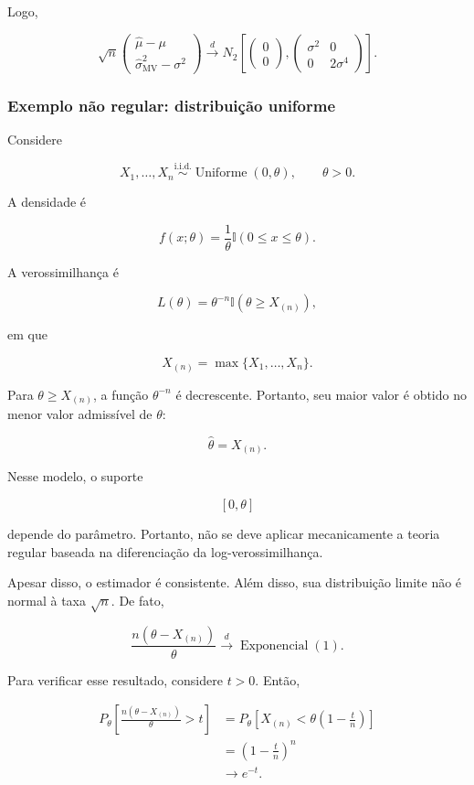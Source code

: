 \documentclass[
  letterpaper,
  DIV=11,
  numbers=noendperiod]{scrreprt}
\begin{document}
Logo,

\[\sqrt n
\begin{pmatrix}
\widehat\mu-\mu\\
\widehat{\sigma}^2_{\mathrm{MV}}-\sigma^2
\end{pmatrix}
\xrightarrow{d}
N_2
\left[
\begin{pmatrix}
0\\
0
\end{pmatrix},
\begin{pmatrix}
\sigma^2 & 0\\
0 & 2\sigma^4
\end{pmatrix}
\right].\]

\subsubsection{Exemplo não regular: distribuição
uniforme}\label{exemplo-nuxe3o-regular-distribuiuxe7uxe3o-uniforme}

Considere

\[X_1,\ldots,X_n
\overset{\mathrm{i.i.d.}}{\sim}
\operatorname{Uniforme}(0,\theta),
\qquad \theta>0.\]

A densidade é

\[f(x;\theta)
=
\frac{1}{\theta}
\mathbb{I}(0\leq x\leq\theta).\]

A verossimilhança é

\[L(\theta)
=
\theta^{-n}
\mathbb{I}
\left(
\theta\geq X_{(n)}
\right),\]

em que

\[X_{(n)}
=
\max
\{X_1,\ldots,X_n\}.\]

Para \(\theta\geq X_{(n)}\), a função \(\theta^{-n}\) é decrescente.
Portanto, seu maior valor é obtido no menor valor admissível de
\(\theta\):

\[\widehat\theta
=
X_{(n)}.\]

Nesse modelo, o suporte

\[[0,\theta]\]

depende do parâmetro. Portanto, não se deve aplicar mecanicamente a
teoria regular baseada na diferenciação da log-verossimilhança.

Apesar disso, o estimador é consistente. Além disso, sua distribuição
limite não é normal à taxa \(\sqrt n\). De fato,

\[\frac{
n(\theta-X_{(n)})
}{
\theta
}
\xrightarrow{d}
\operatorname{Exponencial}(1).\]

Para verificar esse resultado, considere \(t>0\). Então,

\[\begin{aligned}
P_\theta
\left[
\frac{
n(\theta-X_{(n)})
}{
\theta
}
>t
\right]
&=
P_\theta
\left[
X_{(n)}
<
\theta
\left(
1-\frac{t}{n}
\right)
\right]\\
&=
\left(
1-\frac{t}{n}
\right)^n\\
&\longrightarrow
e^{-t}.
\end{aligned}\]
\end{document}
